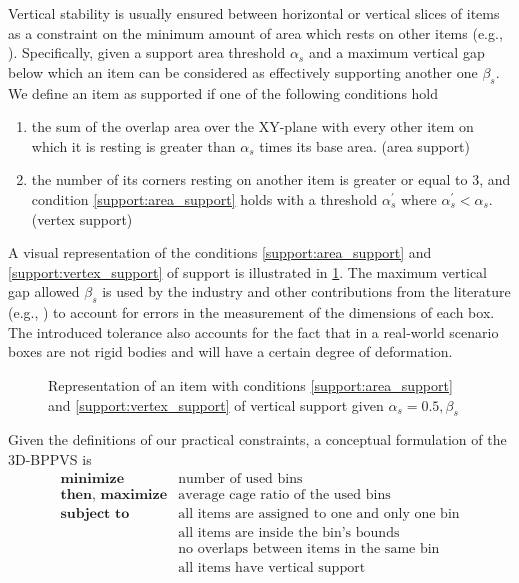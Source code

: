 Vertical stability is usually ensured between horizontal or vertical slices of items as a constraint on the minimum amount of area which rests on other items (e.g., \cite{GZARA20201062,kurpel2020exact,paquay2016mixed}).
Specifically, given a support area threshold $\alpha_s$ and a maximum vertical gap below which an item can be considered as effectively supporting another one $\beta_s$. We define an item as supported if one of the following conditions hold
\begin{enumerate}[label={\textbf{Condition \arabic*}.},ref={\arabic*},leftmargin=*]
    \item the sum of the overlap area over the XY-plane with every other item on which it is resting is greater than $\alpha_s$ times its base area. (area support) \label{support:area_support}
    \item the number of its corners resting on another item is greater or equal to 3, and condition \ref{support:area_support} holds with a threshold $\alpha^\prime_s$ where $\alpha^\prime_s < \alpha_s$. (vertex support) \label{support:vertex_support}
\end{enumerate}
A visual representation of the conditions \ref{support:area_support} and \ref{support:vertex_support} of support is illustrated in \cref{fig:support}.
The maximum vertical gap allowed $\beta_s$ is used by the industry and other contributions from the literature (e.g., \cite{elhedhli2019three}) to account for errors in the measurement of the dimensions of each box.
The introduced tolerance also accounts for the fact that in a real-world scenario boxes are not rigid bodies and will have a certain degree of deformation.

\begin{figure}[H]
    \scalebox{0.55}{%
    
    }
    \caption{Representation of an item with conditions \ref{support:area_support} and \ref{support:vertex_support} of vertical support given $\alpha_s = 0.5, \beta_s$}
    \label{fig:support}
\end{figure}

Given the definitions of our practical constraints, a conceptual formulation of the 3D-BPPVS is
\begin{eqnarray*}
    \textbf{minimize} & \text{number of used bins} \\
    \textbf{then, maximize} & \text{average cage ratio of the used bins} \\
    \textbf{subject to} & \text{all items are assigned to one and only one bin} \\
                                      & \text{all items are inside the bin's bounds} \\
                                      & \text{no overlaps between items in the same bin} \\
                                      & \text{all items have vertical support} \\
\end{eqnarray*}


